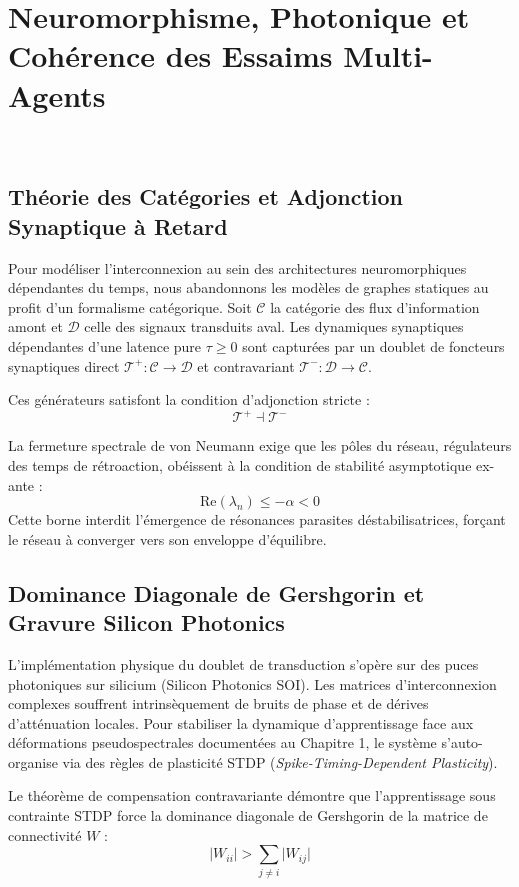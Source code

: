 \chapter{Neuromorphisme, Photonique et Coh{\'e}rence des Essaims Multi-Agents}
\(\label{ch:neuromorphisme}\)

\section{Th{\'e}orie des Cat{\'e}gories et Adjonction Synaptique {\`a} Retard}
Pour mod{\'e}liser l'interconnexion au sein des architectures neuromorphiques d{\'e}pendantes du temps, nous abandonnons les mod{\`e}les de graphes statiques au profit d'un formalisme cat{\'e}gorique. Soit \(\mathcal{C}\) la cat{\'e}gorie des flux d'information amont et \(\mathcal{D}\) celle des signaux transduits aval. Les dynamiques synaptiques d{\'e}pendantes d'une latence pure \(\tau \ge 0\) sont captur{\'e}es par un doublet de foncteurs synaptiques direct \(\mathcal{T}^+ : \mathcal{C} \to \mathcal{D}\) et contravariant \(\mathcal{T}^- : \mathcal{D} \to \mathcal{C}\).

Ces g{\'e}n{\'e}rateurs satisfont la condition d'adjonction stricte :
\[\mathcal{T}^+ \dashv \mathcal{T}^-\]

La fermeture spectrale de von Neumann exige que les p{\^o}les du r{\'e}seau, r{\'e}gulateurs des temps de r{\'e}troaction, ob{\'e}issent {\`a} la condition de stabilit{\'e} asymptotique ex-ante :
\[\text{Re}(\lambda_n) \leq -\alpha < 0\]
Cette borne interdit l'{\'e}mergence de r{\'e}sonances parasites d{\'e}stabilisatrices, for{\c{c}}ant le r{\'e}seau à converger vers son enveloppe d'{\'e}quilibre.

\section{Dominance Diagonale de Gershgorin et Gravure Silicon Photonics}
L'impl{\'e}mentation physique du doublet de transduction s'op{\`e}re sur des puces photoniques sur silicium (Silicon Photonics SOI). Les matrices d'interconnexion complexes souffrent intrins{\`e}quement de bruits de phase et de d{\'e}rives d'att{\'e}nuation locales. Pour stabiliser la dynamique d'apprentissage face aux d{\'e}formations pseudospectrales document{\'e}es au Chapitre 1, le syst{\`e}me s'auto-organise via des r{\`e}gles de plasticité STDP (\textit{Spike-Timing-Dependent Plasticity}).

Le th{\'e}or{\`e}me de compensation contravariante d{\'e}montre que l'apprentissage sous contrainte STDP force la dominance diagonale de Gershgorin de la matrice de connectivit{\'e} \(W\) :
\[\vert{}W_{ii}\vert{} > \sum_{j \neq i} \vert{}W_{ij}\vert{}\]

